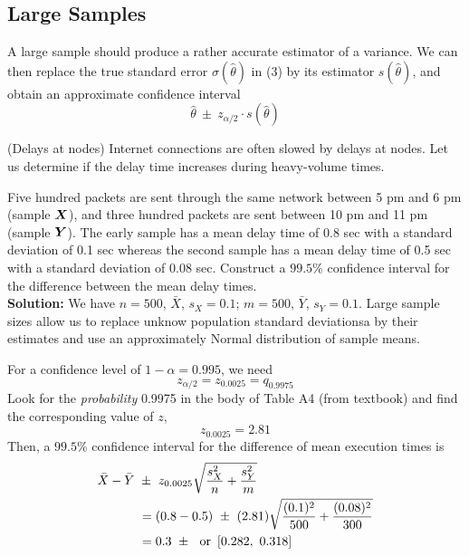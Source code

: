 \subsection{Large Samples}
\label{subsec:large-samples}

A large sample should produce a rather accurate estimator of a variance. We can then
replace the true standard error $\sigma(\hat{\theta})$ in (3) by its estimator $s(\hat{\theta})$, and obtain an approximate confidence interval
\begin{equation*}
  \hat{\theta}\ \pm\ z_{\alpha/2} \cdot s(\hat{\theta})
\end{equation*}

\begin{example}{ (Delays at nodes)}
  Internet connections are often slowed by delays at nodes. Let us determine if the delay time increases during heavy-volume times.
  
  Five hundred packets are sent through the same network between 5 pm and 6 pm (sample $\boldsymbol{X}$), and three hundred packets are sent between 10 pm and 11 pm (sample $\boldsymbol{Y}$). The early sample has a mean delay time of 0.8 sec with a standard deviation of 0.1 sec whereas the second sample has a mean delay time of 0.5 sec with a standard deviation of 0.08 sec. Construct a $99.5\%$ confidence interval for the difference between the mean delay times. \\

  \textbf{Solution:}
  We have $n = 500$, $\bar{X}$, $s_X = 0.1$; $m = 500$, $\bar{Y}$, $s_Y = 0.1$. Large sample sizes allow us to replace unknow population standard deviationsa by their estimates and use an approximately Normal distribution of sample means.

  For a confidence level of $1 - \alpha = 0.995$, we need
  \begin{equation*}
    z_{\alpha/2} = z_{0.0025} = q_{0.9975}
  \end{equation*}
  Look for the \textit{probability} 0.9975 in the body of Table A4 (from textbook) and find the corresponding value of $z$,
  \begin{equation*}
    z_{0.0025} = 2.81
  \end{equation*}
  Then, a $99.5\%$ confidence interval for the difference of mean execution times is
  \begin{align*}
    \bar{X} - \bar{Y} \ &\pm\ z_{0.0025} \sqrt{\frac{s_X^2}{n} + \frac{s_Y^2}{m}}\\
    &= (0.8 - 0.5) \ \pm\ (2.81) \sqrt{\frac{(0.1)^2}{500} + \frac{(0.08)^2}{300}}\\
    &= 0.3 \ \pm\  \textnormal{ or } \left[ 0.282,\ 0.318 \right]
  \end{align*}
\end{example}
